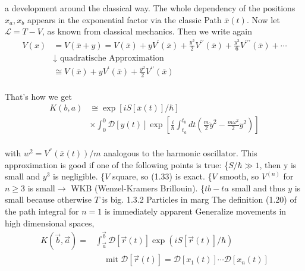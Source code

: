 a development around the classical way. The whole dependency of
the positions $x_a, x_b$ appears in the exponential factor via the classic
Path $\bar{x}(t)$.
Now let $\mathcal{L} = T - V$, as known from classical mechanics. Then
we write again
\\
\begin{equation}
\begin{aligned} V(x) &=V(\bar{x}+y)=V(\bar{x})+y V^{\prime}(\bar{x})+\frac{y^{2}}{2} V^{\prime \prime}(\bar{x})+\frac{y^{3}}{6} V^{\prime \prime \prime}(\bar{x})+\cdots \\ & \downarrow \text { quadratische Approximation } \\ & \cong V(\bar{x})+y V^{\prime}(\bar{x})+\frac{y^{2}}{2} V^{\prime \prime}(\bar{x}) \end{aligned}
\end{equation}\\
That's how we get
\\
\begin{equation}
\begin{aligned} K(b, a) & \cong \exp [i S[\bar{x}(t)] / \hbar] \\ & \times \int_{0}^{0} \mathcal{D}[y(t)] \exp \left[\frac{i}{\hbar} \int_{t_{a}}^{t_{b}} d t\left(\frac{m}{2} \dot{y}^{2}-\frac{m \omega^{2}}{2} y^{2}\right)\right] \end{aligned}
\end{equation}\\
with $w^2 = V^{''}(\bar{x}(t))/m$ analogous to the harmonic oscillator. This approximation
is good if one of the following points is true:
\{$S/\hbar \gg 1$, then y is small and $y^3$ is negligible.
\{$V$ square, so (1.33) is exact.
\{$V$ smooth, so $V^{(n)}$ for $n\geq 3$ is small$\to$ WKB (Wenzel-Kramers Brillouin).
\{$tb - ta$ small and thus $y$ is small because otherwise $T$ is big.
1.3.2 Particles in marg
The definition (1.20) of the path integral for $n = 1$ is immediately apparent
Generalize movements in high dimensional spaces,
\\
\begin{equation}
\begin{aligned} K(\vec{b}, \vec{a})=& \int_{\vec{a}}^{\vec{b}} \mathcal{D}[\vec{r}(t)] \exp (i S[\vec{r}(t)] / \hbar) \\ & \quad \operatorname{mit} \mathcal{D}[\vec{r}(t)]=\mathcal{D}\left[x_{1}(t)\right] \cdots \mathcal{D}\left[x_{n}(t)\right] \end{aligned}
\end{equation}\\
